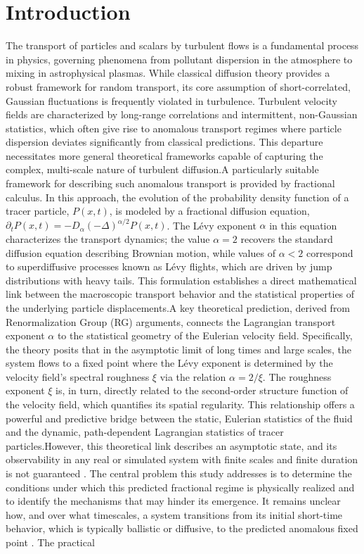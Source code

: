 \documentclass[]{article}
\begin{document}
\section{Introduction}
\label{sec:intro}
The transport of particles and scalars by turbulent flows is a fundamental process in physics, governing phenomena from pollutant dispersion in the atmosphere to mixing in astrophysical plasmas. While classical diffusion theory provides a robust framework for random transport, its core assumption of short-correlated, Gaussian fluctuations is frequently violated in turbulence. Turbulent velocity fields are characterized by long-range correlations and intermittent, non-Gaussian statistics, which often give rise to anomalous transport regimes where particle dispersion deviates significantly from classical predictions. This departure necessitates more general theoretical frameworks capable of capturing the complex, multi-scale nature of turbulent diffusion.A particularly suitable framework for describing such anomalous transport is provided by fractional calculus. In this approach, the evolution of the probability density function of a tracer particle, $P(x,t)$, is modeled by a fractional diffusion equation, $\partial_t P(x,t) = -D_\alpha(-\Delta)^{\alpha/2} P(x,t)$. The Lévy exponent $\alpha$ in this equation characterizes the transport dynamics; the value $\alpha=2$ recovers the standard diffusion equation describing Brownian motion, while values of $\alpha < 2$ correspond to superdiffusive processes known as Lévy flights, which are driven by jump distributions with heavy tails. This formulation establishes a direct mathematical link between the macroscopic transport behavior and the statistical properties of the underlying particle displacements.A key theoretical prediction, derived from Renormalization Group (RG) arguments, connects the Lagrangian transport exponent $\alpha$ to the statistical geometry of the Eulerian velocity field. Specifically, the theory posits that in the asymptotic limit of long times and large scales, the system flows to a fixed point where the Lévy exponent is determined by the velocity field's spectral roughness $\xi$ via the relation $\alpha = 2/\xi$. The roughness exponent $\xi$ is, in turn, directly related to the second-order structure function of the velocity field, which quantifies its spatial regularity. This relationship offers a powerful and predictive bridge between the static, Eulerian statistics of the fluid and the dynamic, path-dependent Lagrangian statistics of tracer particles.However, this theoretical link describes an asymptotic state, and its observability in any real or simulated system with finite scales and finite duration is not guaranteed  \citep{onizawa2026finitetimeobservabilityoscillatoryinstabilities}. The central problem this study addresses is to determine the conditions under which this predicted fractional regime is physically realized and to identify the mechanisms that may hinder its emergence. It remains unclear how, and over what timescales, a system transitions from its initial short-time behavior, which is typically ballistic or diffusive, to the predicted anomalous fixed point  \citep{onizawa2026finitetimeobservabilityoscillatoryinstabilities}. The practical 
\end{document}
